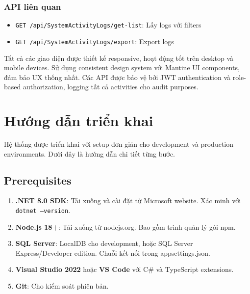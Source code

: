 \documentclass[conference,a4paper]{IEEEtran}
\begin{document}
\subsubsection{API liên quan}
\begin{itemize}
  \item \texttt{GET /api/SystemActivityLogs/get-list}: Lấy logs với filters
  \item \texttt{GET /api/SystemActivityLogs/export}: Export logs
\end{itemize}

Tất cả các giao diện được thiết kế responsive, hoạt động tốt trên desktop và mobile devices. Sử dụng consistent design system với Mantine UI components, đảm bảo UX thống nhất. Các API được bảo vệ bởi JWT authentication và role-based authorization, logging tất cả activities cho audit purposes.

\section{Hướng dẫn triển khai}
Hệ thống được triển khai với setup đơn giản cho development và production environments. Dưới đây là hướng dẫn chi tiết từng bước.

\subsection{Prerequisites}
\begin{enumerate}
  \item \textbf{.NET 8.0 SDK}: Tải xuống và cài đặt từ Microsoft website. Xác minh với \texttt{dotnet --version}.
  \item \textbf{Node.js 18+}: Tải xuống từ nodejs.org. Bao gồm trình quản lý gói npm.
  \item \textbf{SQL Server}: LocalDB cho development, hoặc SQL Server Express/Developer edition. Chuỗi kết nối trong appsettings.json.
  \item \textbf{Visual Studio 2022} hoặc \textbf{VS Code} với C\# và TypeScript extensions.
  \item \textbf{Git}: Cho kiểm soát phiên bản.
\end{enumerate}
\end{document}
